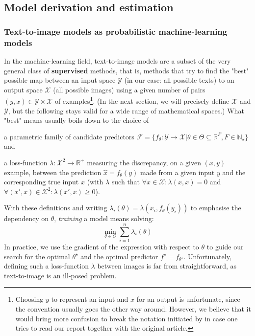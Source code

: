 \documentclass{article}
\begin{document}
\begin{multicols}{2}
\subsection{Model derivation and estimation} \label{sec:derivation}

\subsubsection{Text-to-image models as probabilistic machine-learning models} \label{section:probml}


In the machine-learning field, text-to-image models are a subset of the very general class of \textbf{supervised} methods, that is, methods that try to find the "best" possible map between an input space $\mathcal{Y}$ (in our case: all possible texts) to an output space $\mathcal{X}$ (all possible images) using a given number of pairs $(y,x)\in\mathcal{Y}\times\mathcal{X}$ of examples\footnote{Choosing $y$ to represent an input and $x$ for an output is unfortunate, since the convention usually goes the other way around.
However, we believe that it would bring more confusion to break the notation initiated by \citeauthor{zeroshot} in case one tries to read our report together with the original article.}.
(In the next section, we will precisely define $\mathcal{X}$ and $\mathcal{Y}$, but the following stays valid for a wide range of mathematical spaces.)
What "best" means usually boils down to the choice of \begin{enumerate*}[label=(\roman*)]
\item a parametric family of candidate predictors $\mathcal{F}=\{f_\theta:\mathcal{Y}\to\mathcal{X}|\theta \in \Theta \subseteq \mathbb{R}^F, F\in\mathbb{N}_\star\}$ and 
\item a loss-function $\lambda:\mathcal{X}^2\to\mathbb{R}^+$ measuring the discrepancy, on a given $(x,y)$ example, between the prediction $\hat x = f_\theta(y)$ made from a given input $y$ and the corresponding true input $x$
(with $\lambda$ such that $\forall x \in \mathcal{X}:\lambda(x,x)=0$ and $\forall (x',x)\in\mathcal{X}^2:\lambda(x',x)\geqslant 0$).
\end{enumerate*}
With these definitions and writing $\lambda_i(\theta)=\lambda(x_i,f_\theta(y_i))$ to emphasise the dependency on $\theta$, \textit{training} a model means solving:
\begin{equation} \label{eq:minloss}
    \min_{\theta\in\Theta} \sum_{i=1}^{n} \lambda_i(\theta)
\end{equation}
In practice, we use the gradient of the expression with respect to $\theta$ to guide our search for the optimal $\theta^\star$ and the optimal predictor $f^\star=f_{\theta^\star}$.
Unfortunately, defining such a loss-function $\lambda$ between images is far from straightforward, as text-to-image is an ill-posed problem.


\end{multicols}
\end{document}
